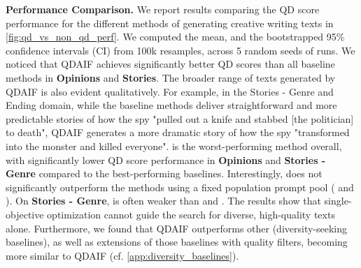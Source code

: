 \textbf{Performance Comparison.}
We report results comparing the QD score performance for the different methods of generating creative writing texts in \cref{fig:qd_vs_non_qd_perf}. We computed the mean, and the bootstrapped 95\% confidence intervals (CI) from 100k resamples, across 5 random seeds of runs. We noticed that QDAIF achieves significantly better QD scores than all baseline methods in \textbf{Opinions} and \textbf{Stories}. The broader range of texts generated by QDAIF is also evident qualitatively. For example, in the Stories - Genre and Ending domain, while the baseline methods deliver straightforward and more predictable stories of how the spy "pulled out a knife and stabbed [the politician] to death", QDAIF generates a more dramatic story of how the spy "transformed into the monster and killed everyone". \basethree{} is the worst-performing method overall, with significantly lower QD score performance in \textbf{Opinions} and \textbf{Stories - Genre} compared to the best-performing baselines. Interestingly, \basefour{} does not significantly outperform the methods using a fixed population prompt pool (\baseone{} and \basetwo). On \textbf{Stories - Genre}, \basefour{} is often weaker than \baseone{} and \basetwo. The results show that single-objective optimization cannot guide the search for diverse, high-quality texts alone. Furthermore, we found that QDAIF outperforms other (diversity-seeking baselines), as well as extensions of those baselines with quality filters, becoming more similar to QDAIF (cf. \cref{app:diversity_baselines}).

